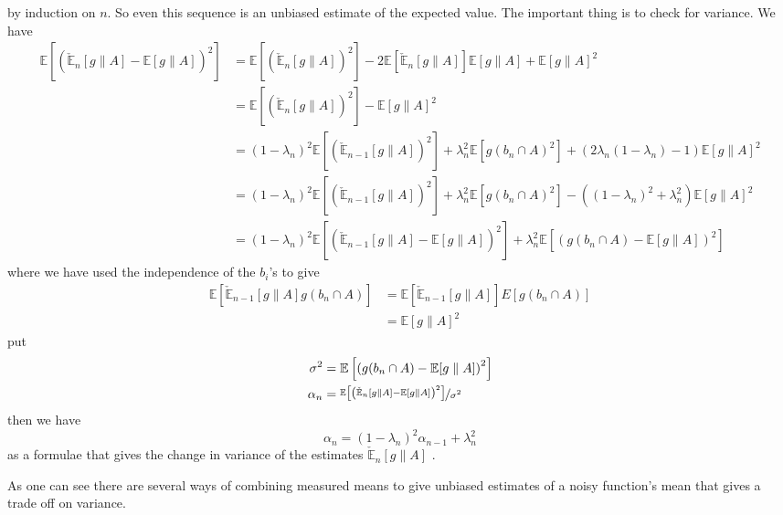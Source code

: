 \documentclass[a4paper,oneside,english]{book}
\numberwithin{equation}{section}
\numberwithin{figure}{section}
\begin{document}
by induction on $n$. So even this sequence is an unbiased estimate
of the expected value. The important thing is to check for variance.
We have
\begin{align*}
\mathbb{E}\left[\left(\mathbb{\check{E}}_{n}[g\parallel A]-\mathbb{E}[g\parallel A]\right)^{2}\right] & = \mathbb{E}\left[\left(\mathbb{\check{E}}_{n}[g\parallel A]\right)^{2}\right]-2\mathbb{E}\left[\mathbb{\check{E}}_{n}[g\parallel A]\right]\mathbb{E}[g\parallel A]+\mathbb{E}[g\parallel A]^{2}\\
& = \mathbb{E}\left[\left(\mathbb{\check{E}}_{n}[g\parallel A]\right)^{2}\right]-\mathbb{E}[g\parallel A]^{2}\\
& = (1-\lambda_{n})^{2}\mathbb{E}\left[\left(\mathbb{\check{E}}_{n-1}[g\parallel A]\right)^{2}\right]+\lambda_{n}^{2}\mathbb{E}\left[g(b_{n}\cap A)^{2}\right]+(2\lambda_{n}(1-\lambda_{n})-1)\mathbb{E}[g\parallel A]^{2}\\
& = (1-\lambda_{n})^{2}\mathbb{E}\left[\left(\mathbb{\check{E}}_{n-1}[g\parallel A]\right)^{2}\right]+\lambda_{n}^{2}\mathbb{E}\left[g(b_{n}\cap A)^{2}\right]-((1-\lambda_{n})^{2}+\lambda_{n}^{2})\mathbb{E}[g\parallel A]^{2}\\
& = (1-\lambda_{n})^{2}\mathbb{E}\left[\left(\mathbb{\check{E}}_{n-1}[g\parallel A]-\mathbb{E}[g\parallel A]\right)^{2}\right]+\lambda_{n}^{2}\mathbb{E}\left[\left(g(b_{n}\cap A)-\mathbb{E}[g\parallel A]\right)^{2}\right]
\end{align*}
where we have used the independence of the $b_{i}$'s to give
\begin{align*}
\mathbb{E}\left[\mathbb{\check{E}}_{n-1}[g\parallel A]g(b_{n}\cap A)\right] & = \mathbb{E}\left[\check{\mathbb{E}}_{n-1}[g\parallel A]\right]E\left[g(b_{n}\cap A)\right]\\
& = \mathbb{E}[g\parallel A]^{2}
\end{align*}
put
\begin{align*}
\sigma^{2} & = \mathbb{E}\left[\left(g(b_{n}\cap A)-\mathbb{E}[g\parallel A]\right)^{2}\right]\\
\alpha_{n} & = \nicefrac{\mathbb{E}\left[\left(\mathbb{\check{E}}_{n}[g\parallel A]-\mathbb{E}[g\parallel A]\right)^{2}\right]}{\sigma^{2}}
\end{align*}
then we have
\[
\alpha_{n}=(1-\lambda_{n})^{2}\alpha_{n-1}+\lambda_{n}^{2}
\]
as a formulae that gives the change in variance of the estimates $\check{\mathbb{E}}_{n}[g\parallel A]$
.

As one can see there are several ways of combining measured means to give unbiased estimates of a noisy function's mean that gives a trade off on variance.
 
\end{document}

